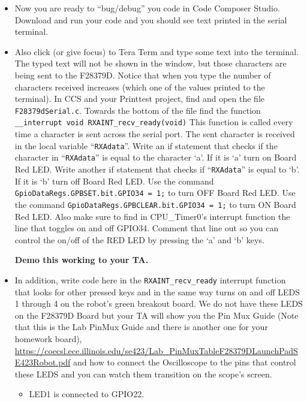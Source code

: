 \documentclass[11pt]{article}
\begin{document}
\begin{itemize}
    \item Now you are ready to “bug/debug” you code in Code Composer Studio. Download and run your code and you should see text printed in the serial terminal.
        \item Also click (or give focus) to Tera Term and type some text into the terminal. The typed text will not be shown in the window, but those characters are being sent to the F28379D. Notice that when you type the number of characters received increases (which one of the values printed to the terminal). In CCS and your Printtest project, find and open the file \lstinline|F28379dSerial.c|. Towards the bottom of the file find the function \texttt{__interrupt void RXAINT_recv_ready(void)} This function is called every time a character is sent across the serial port. The sent character is received in the local variable “\texttt{RXAdata}”. Write an if statement that checks if the character in “\texttt{RXAdata}” is equal to the character ‘a’. If it is ‘a’ turn on Board Red LED. Write another if statement that checks if “\texttt{RXAdata}” is equal to ‘b’. If it is ‘b’ turn off Board Red LED. Use the command \texttt{GpioDataRegs.GPBSET.bit.GPIO34 = 1;} to turn OFF Board Red LED. Use the command \texttt{GpioDataRegs.GPBCLEAR.bit.GPIO34 = 1;} to turn ON Board Red LED. Also make sure to find in CPU\_Timer0’s interrupt function the line that toggles on and off GPIO34. Comment that line out so you can control the on/off of the RED LED by pressing the ‘a’ and ‘b’ keys.
        \begin{checkoff}
                \textbf{Demo this working to your TA.}
        \end{checkoff}
        \item In addition, write code here in the \texttt{RXAINT_recv_ready} interrupt function that looks for other pressed keys and in the same way turns on and off LEDS 1 through 4 on the robot’s green breakout board. We do not have these LEDS on the F28379D Board but your TA will show you the Pin Mux Guide (Note that this is the Lab PinMux Guide and there is another one for your homework board), \url{https://coecsl.ece.illinois.edu/se423/Lab_PinMuxTableF28379DLaunchPadSE423Robot.pdf} and how to connect the Oscilloscope to the pins that control these LEDS and you can watch them transition on the scope’s screen.
        \begin{itemize}
            \item LED1 is connected to GPIO22.

\end{itemize}
\end{itemize}
\end{document}
